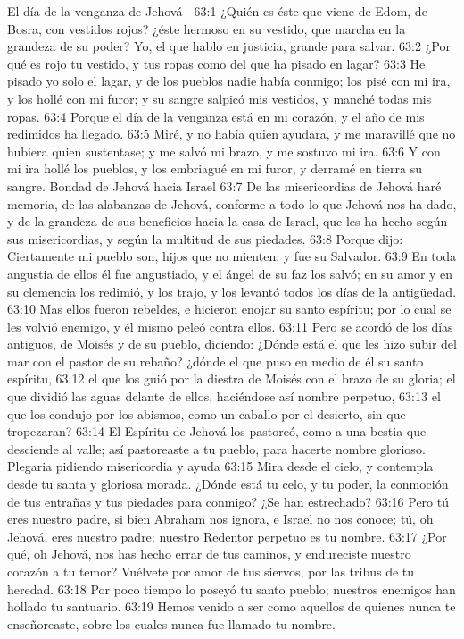 El día de la venganza de Jehová  

63:1 ¿Quién es éste que viene de Edom, de Bosra, con vestidos rojos? ¿éste hermoso en su vestido, que marcha en la grandeza de su poder? Yo, el que hablo en justicia, grande para salvar.  
63:2 ¿Por qué es rojo tu vestido, y tus ropas como del que ha pisado en lagar?  
63:3 He pisado yo solo el lagar, y de los pueblos nadie había conmigo; los pisé con mi ira, y los hollé con mi furor; y su sangre salpicó mis vestidos, y manché todas mis ropas. 
63:4 Porque el día de la venganza está en mi corazón, y el año de mis redimidos ha llegado.  
63:5 Miré, y no había quien ayudara, y me maravillé que no hubiera quien sustentase; y me salvó mi brazo, y me sostuvo mi ira. 
63:6 Y con mi ira hollé los pueblos, y los embriagué en mi furor, y derramé en tierra su sangre.  
Bondad de Jehová hacia Israel  
63:7 De las misericordias de Jehová haré memoria, de las alabanzas de Jehová, conforme a todo lo que Jehová nos ha dado, y de la grandeza de sus beneficios hacia la casa de Israel, que les ha hecho según sus misericordias, y según la multitud de sus piedades.  
63:8 Porque dijo: Ciertamente mi pueblo son, hijos que no mienten; y fue su Salvador.  
63:9 En toda angustia de ellos él fue angustiado, y el ángel de su faz los salvó; en su amor y en su clemencia los redimió, y los trajo, y los levantó todos los días de la antigüedad.  
63:10 Mas ellos fueron rebeldes, e hicieron enojar su santo espíritu; por lo cual se les volvió enemigo, y él mismo peleó contra ellos.  
63:11 Pero se acordó de los días antiguos, de Moisés y de su pueblo, diciendo: ¿Dónde está el que les hizo subir del mar con el pastor de su rebaño? ¿dónde el que puso en medio de él su santo espíritu,  
63:12 el que los guió por la diestra de Moisés con el brazo de su gloria; el que dividió las aguas delante de ellos, haciéndose así nombre perpetuo,  
63:13 el que los condujo por los abismos, como un caballo por el desierto, sin que tropezaran?  
63:14 El Espíritu de Jehová los pastoreó, como a una bestia que desciende al valle; así pastoreaste a tu pueblo, para hacerte nombre glorioso.  
Plegaria pidiendo misericordia y ayuda  
63:15 Mira desde el cielo, y contempla desde tu santa y gloriosa morada. ¿Dónde está tu celo, y tu poder, la conmoción de tus entrañas y tus piedades para conmigo? ¿Se han estrechado?  
63:16 Pero tú eres nuestro padre, si bien Abraham nos ignora, e Israel no nos conoce; tú, oh Jehová, eres nuestro padre; nuestro Redentor perpetuo es tu nombre.  
63:17 ¿Por qué, oh Jehová, nos has hecho errar de tus caminos, y endureciste nuestro corazón a tu temor? Vuélvete por amor de tus siervos, por las tribus de tu heredad.  
63:18 Por poco tiempo lo poseyó tu santo pueblo; nuestros enemigos han hollado tu santuario.  
63:19 Hemos venido a ser como aquellos de quienes nunca te enseñoreaste, sobre los cuales nunca fue llamado tu nombre.  

